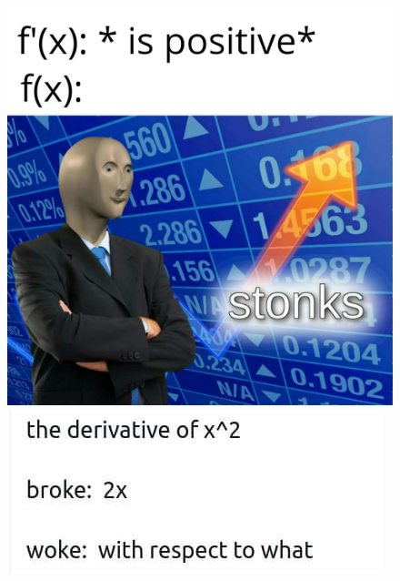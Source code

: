 \documentclass[handout, aspectratio=169]{beamer}
\begin{document}
\begin{frame} 
	\begin{figure}[t]
		\begin{minipage}{0.48\textwidth}
			\centering
			\includegraphics[width=5 cm]{13.jpg}
			
		\end{minipage}
		\begin{minipage}{0.48\textwidth}
			\centering
			\includegraphics[width=5 cm]{14.jpg}
			
		\end{minipage}
	\end{figure}
\end{frame}
\end{document}
